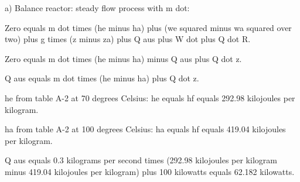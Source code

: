 a) Balance reactor: steady flow process with m dot:

Zero equals m dot times (he minus ha) plus (we squared minus wa squared over two) plus g times (z minus za) plus Q aus plus W dot plus Q dot R.

Zero equals m dot times (he minus ha) minus Q aus plus Q dot z.

Q aus equals m dot times (he minus ha) plus Q dot z.

he from table A-2 at 70 degrees Celsius: he equals hf equals 292.98 kilojoules per kilogram.

ha from table A-2 at 100 degrees Celsius: ha equals hf equals 419.04 kilojoules per kilogram.

Q aus equals 0.3 kilograms per second times (292.98 kilojoules per kilogram minus 419.04 kilojoules per kilogram) plus 100 kilowatts equals 62.182 kilowatts.